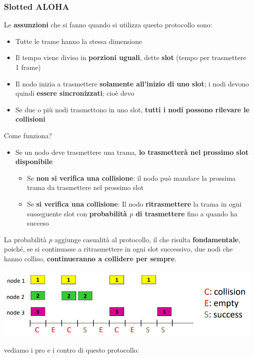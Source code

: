 \documentclass[12pt]{article}
\begin{document}
\subsubsection{Slotted ALOHA}
Le \textbf{assunzioni} che si fanno quando si utilizza questo protocollo sono:
\begin{itemize}
    \item Tutte le trame hanno la stessa dimensione
    \item Il tempo viene diviso in \textbf{porzioni uguali}, dette \textbf{slot} (tempo per trasmettere 1 frame)
    \item Il nodo inizia a trasmettere \textbf{solamente all'inizio di uno slot}; i nodi devono quindi \textbf{essere sincronizzati}; cioè devo
    \item Se due o più nodi trasmettono in uno slot, \textbf{tutti i nodi possono rilevare le collisioni}
\end{itemize}
Come funziona?
\begin{itemize}
    \item Se un nodo deve trasmettere una trama, \textbf{lo trasmetterà nel prossimo slot disponibile}
    \begin{itemize}
        \item Se \textbf{non si verifica una collisione}: il nodo può mandare la prossima trama da trasmettere nel prossimo slot
        \item Se \textbf{si verifica una collisione}: Il nodo \textbf{ritrasmettere} la trama in ogni susseguente slot con \textbf{probabilità $p$ di trasmettere} fino a quando ha succeso
    \end{itemize}
\end{itemize}
La probabilità $p$ aggiunge casualità al protocollo, il che risulta \textbf{fondamentale}, poiché, se si continuasse a ritrasmettere in ogni slot successivo,
due nodi che hanno colliso, \textbf{continueranno a collidere per sempre}. 
\begin{center}
    \includegraphics[width =0.95\linewidth]{Images/120.png}
\end{center}
vediamo i pro e i contro di questo protocollo:
\end{document}
